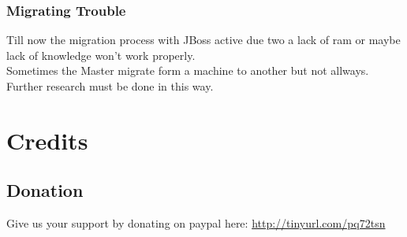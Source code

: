 \documentclass[11pt,a4paper]{article}
\begin{document}
\subsubsection{Migrating Trouble}
Till now the migration process with JBoss active due two a lack of ram or maybe lack of knowledge won't work properly.\\
Sometimes the Master migrate form a machine to another but not allways.\\
Further research must be done in this way.

























\section{Credits}
\subsection{Donation}
Give us your support by donating on paypal here:
\url{http://tinyurl.com/pq72tsn}
\end{document}
